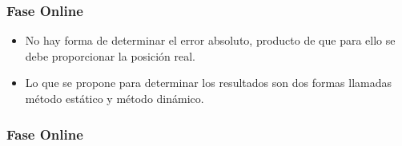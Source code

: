 \documentclass[handout]{beamer}
\begin{document}
\begin{frame}
\frametitle{Fase Online}

\begin{itemize}
\item No hay forma de determinar el error absoluto, producto de que para ello se debe proporcionar la posición real.

\pause
\item Lo que se propone para determinar los resultados son dos formas llamadas método estático y método dinámico.
\end{itemize}

\end{frame}

\begin{frame}
\frametitle{Fase Online}

\begin{columns}[t] %


\end{columns}
\end{frame}
\end{document}
